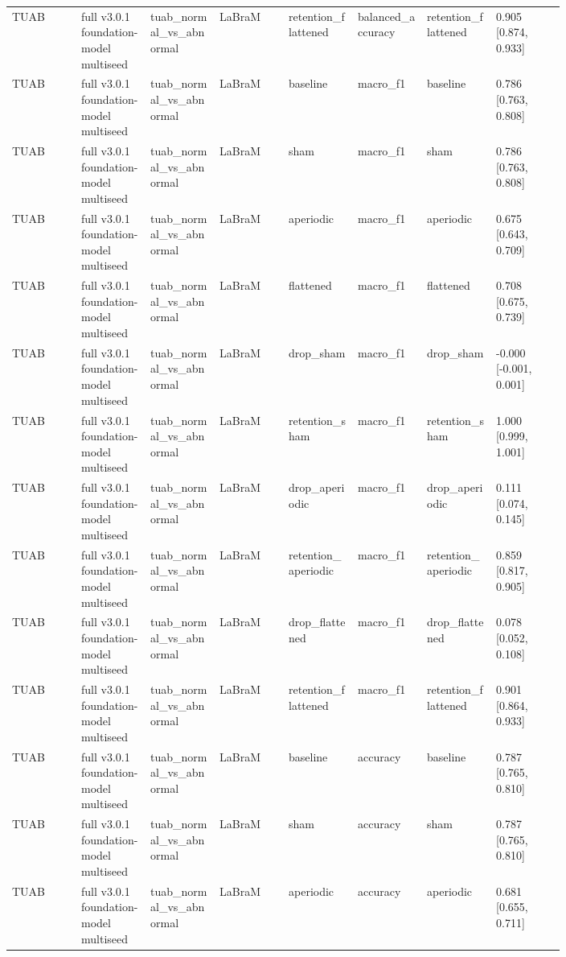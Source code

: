 \begin{longtable}{p{0.10\linewidth}p{0.10\linewidth}p{0.10\linewidth}p{0.10\linewidth}p{0.10\linewidth}p{0.10\linewidth}p{0.10\linewidth}p{0.10\linewidth}}
TUAB & full v3.0.1 foundation-model multiseed & tuab\_normal\_vs\_abnormal & LaBraM & retention\_flattened & balanced\_accuracy & retention\_flattened & 0.905 [0.874, 0.933]\\
TUAB & full v3.0.1 foundation-model multiseed & tuab\_normal\_vs\_abnormal & LaBraM & baseline & macro\_f1 & baseline & 0.786 [0.763, 0.808]\\
TUAB & full v3.0.1 foundation-model multiseed & tuab\_normal\_vs\_abnormal & LaBraM & sham & macro\_f1 & sham & 0.786 [0.763, 0.808]\\
TUAB & full v3.0.1 foundation-model multiseed & tuab\_normal\_vs\_abnormal & LaBraM & aperiodic & macro\_f1 & aperiodic & 0.675 [0.643, 0.709]\\
TUAB & full v3.0.1 foundation-model multiseed & tuab\_normal\_vs\_abnormal & LaBraM & flattened & macro\_f1 & flattened & 0.708 [0.675, 0.739]\\
TUAB & full v3.0.1 foundation-model multiseed & tuab\_normal\_vs\_abnormal & LaBraM & drop\_sham & macro\_f1 & drop\_sham & -0.000 [-0.001, 0.001]\\
TUAB & full v3.0.1 foundation-model multiseed & tuab\_normal\_vs\_abnormal & LaBraM & retention\_sham & macro\_f1 & retention\_sham & 1.000 [0.999, 1.001]\\
TUAB & full v3.0.1 foundation-model multiseed & tuab\_normal\_vs\_abnormal & LaBraM & drop\_aperiodic & macro\_f1 & drop\_aperiodic & 0.111 [0.074, 0.145]\\
TUAB & full v3.0.1 foundation-model multiseed & tuab\_normal\_vs\_abnormal & LaBraM & retention\_aperiodic & macro\_f1 & retention\_aperiodic & 0.859 [0.817, 0.905]\\
TUAB & full v3.0.1 foundation-model multiseed & tuab\_normal\_vs\_abnormal & LaBraM & drop\_flattened & macro\_f1 & drop\_flattened & 0.078 [0.052, 0.108]\\
TUAB & full v3.0.1 foundation-model multiseed & tuab\_normal\_vs\_abnormal & LaBraM & retention\_flattened & macro\_f1 & retention\_flattened & 0.901 [0.864, 0.933]\\
TUAB & full v3.0.1 foundation-model multiseed & tuab\_normal\_vs\_abnormal & LaBraM & baseline & accuracy & baseline & 0.787 [0.765, 0.810]\\
TUAB & full v3.0.1 foundation-model multiseed & tuab\_normal\_vs\_abnormal & LaBraM & sham & accuracy & sham & 0.787 [0.765, 0.810]\\
TUAB & full v3.0.1 foundation-model multiseed & tuab\_normal\_vs\_abnormal & LaBraM & aperiodic & accuracy & aperiodic & 0.681 [0.655, 0.711]\\

\end{longtable}
